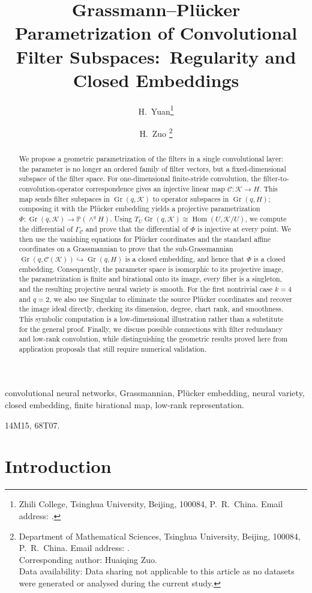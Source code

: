 \documentclass{siamonline250211}
\title{Grassmann--Pl\"ucker Parametrization of Convolutional Filter Subspaces:\
Regularity and Closed Embeddings}
\author{H.~Yuan\thanks{Zhili College, Tsinghua University, Beijing, 100084,
P.~R.~China. Email address: \email{yuanhy24@mails.tsinghua.edu.cn}.}
\and H.~Zuo \thanks{Department of Mathematical Sciences, Tsinghua University,
Beijing, 100084, P.~R.~China. Email address: \email{hqzuo@mail.tsinghua.edu.cn}.\\
Corresponding author: Huaiqing Zuo.\\
Data availability: Data sharing not applicable to this article as no datasets were generated or analysed during the current study.
}
}
\newcommand{\PP}{\mathbb P}
\newcommand{\Gr}{\operatorname{Gr}}
\newcommand{\Hom}{\operatorname{Hom}}
\newcommand{\cK}{\mathcal K}
\newcommand{\cC}{\mathcal C}
\begin{document}
\maketitle

\begin{abstract}
We propose a geometric parametrization of the filters in a single convolutional
layer: the parameter is no longer an ordered family of filter vectors, but a
fixed-dimensional subspace of the filter space. For one-dimensional finite-stride
convolution, the filter-to-convolution-operator correspondence gives an injective
linear map $\cC:\cK\to H$. This map sends filter subspaces in $\Gr(q,\cK)$ to
operator subspaces in $\Gr(q,H)$; composing it with the Pl\"ucker embedding yields
a projective parametrization $\Phi:\Gr(q,\cK)\to\PP(\wedge^qH)$. Using
$T_U\Gr(q,\cK)\cong\Hom(U,\cK/U)$, we compute the differential of
$\Gamma_{\cC}$ and prove that the differential of $\Phi$ is injective at every
point. We then use the vanishing equations for Pl\"ucker coordinates and the
standard affine coordinates on a Grassmannian to prove that the sub-Grassmannian
$\Gr(q,\cC(\cK))\hookrightarrow\Gr(q,H)$ is a closed embedding, and hence that
$\Phi$ is a closed embedding. Consequently, the parameter space is isomorphic
to its projective image, the parametrization is finite and birational onto its
image, every fiber is a singleton, and the resulting projective neural variety
is smooth. For the first nontrivial case $k=4$ and $q=2$, we also use Singular
to eliminate the source Pl\"ucker coordinates and recover the image ideal
directly, checking its dimension, degree, chart rank, and smoothness. This
symbolic computation is a low-dimensional illustration rather than a substitute
for the general proof. Finally, we discuss possible connections with filter
redundancy and low-rank convolution, while distinguishing the geometric results
proved here from application proposals that still require numerical validation.
\end{abstract}

\begin{keywords}
convolutional neural networks, Grassmannian, Pl\"ucker embedding, neural variety,
closed embedding, finite birational map, low-rank representation.
\end{keywords}

\begin{MSCcodes}
14M15, 68T07.
\end{MSCcodes}

\section{Introduction}
\end{document}
